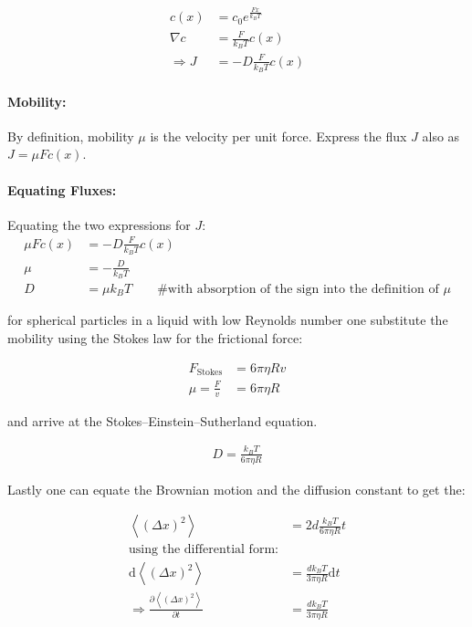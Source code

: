 \documentclass[12pt,english,ngerman]{scrartcl}
\begin{document}
\begin{align*}
	c(x)          & = c_0 e^{\frac{Fx}{k_BT}} \\
	\nabla c      & = \frac{F}{k_BT} c(x)     \\
	\Rightarrow J & = -D \frac{F}{k_BT} c(x)
\end{align*}

\paragraph{Mobility:} By definition, mobility $\mu$ is the velocity per unit force. Express the flux
$J$ also as $J=\mu Fc(x)$.

\paragraph{Equating Fluxes:} Equating the two expressions for $J$:
\begin{align*}
	\mu Fc(x) & = -D \frac{F}{k_BT} c(x)                                                  \\
	\mu       & = -\frac{D}{k_BT}                                                         \\
	D         & = \mu k_BT\qquad \# \text{with absorption of the sign into the definition
		of } \mu
\end{align*}

for spherical particles in a liquid with low Reynolds number one substitute the
mobility using the Stokes law for the frictional force:

\begin{align*}
	F_\text{Stokes}   & = 6 \pi \eta R v \\
	\mu = \frac{F}{v} & = 6 \pi \eta R
\end{align*}

and arrive at the Stokes–Einstein–Sutherland
equation.\cite{einsteinUberMolekularkinetischenTheorie1905}

\begin{align*}
	D = \frac{k_B T}{6 \pi \eta R}
	\label{eq:sto_ein_sut}
\end{align*}

Lastly one can equate the Brownian motion and the diffusion constant to get
the:

\begin{align*}
	\left \langle (\Delta x)^2 \right \rangle                                         & = 2 d \frac{k_B T}{6 \pi \eta R} t        \\
	\text{using the differential form:}                                               &                                           \\
	\text{d}\left \langle (\Delta x)^2 \right \rangle                                 & =  \frac{d k_B T}{3 \pi \eta R} \text{d}t \\
	\Rightarrow \frac{\partial \left \langle (\Delta x)^2 \right \rangle}{\partial t} & =  \frac{d k_B T}{3 \pi \eta R}
\end{align*}
\end{document}
